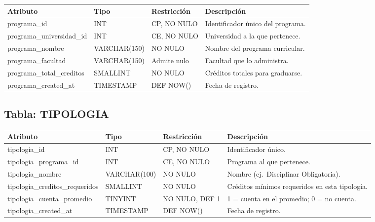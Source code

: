 \documentclass[12pt, letterpaper, twoside]{article}
\begin{document}
\begin{center}
\begin{tabular}{p{4cm} p{2.8cm} p{2.8cm} p{4cm}}
\toprule
\textbf{Atributo} & \textbf{Tipo} & \textbf{Restricción} & \textbf{Descripción} \\
\midrule
programa\_id               & INT          & CP, NO NULO   & Identificador único del programa. \\
programa\_universidad\_id  & INT          & CE, NO NULO   & Universidad a la que pertenece. \\
programa\_nombre           & VARCHAR(150) & NO NULO       & Nombre del programa curricular. \\
programa\_facultad         & VARCHAR(150) & Admite nulo   & Facultad que lo administra. \\
programa\_total\_creditos  & SMALLINT     & NO NULO       & Créditos totales para graduarse. \\
programa\_created\_at      & TIMESTAMP    & DEF NOW()     & Fecha de registro. \\
\bottomrule
\end{tabular}
\end{center}

\subsection{Tabla: TIPOLOGIA}

\begin{center}
\begin{tabular}{p{4.2cm} p{2.8cm} p{2.8cm} p{3.8cm}}
\toprule
\textbf{Atributo} & \textbf{Tipo} & \textbf{Restricción} & \textbf{Descripción} \\
\midrule
tipologia\_id                    & INT       & CP, NO NULO   & Identificador único. \\
tipologia\_programa\_id          & INT       & CE, NO NULO   & Programa al que pertenece. \\
tipologia\_nombre                & VARCHAR(100) & NO NULO    & Nombre (ej.\ Disciplinar Obligatoria). \\
tipologia\_creditos\_requeridos  & SMALLINT  & NO NULO       & Créditos mínimos requeridos en esta tipología. \\
tipologia\_cuenta\_promedio      & TINYINT   & NO NULO, DEF 1 & 1 = cuenta en el promedio; 0 = no cuenta. \\
tipologia\_created\_at           & TIMESTAMP & DEF NOW()     & Fecha de registro. \\
\bottomrule
\end{tabular}
\end{center}
\end{document}
